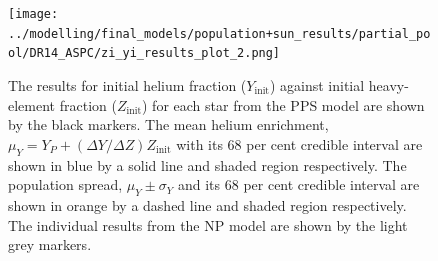 \documentclass[a4paper,fleqn,usenatbib]{mnras}
\begin{document}


\begin{figure}
    \centering
    \texttt{[image: ../modelling/final\_models/population+sun\_results/partial\_pool/DR14\_ASPC/zi\_yi\_results\_plot\_2.png]}
    \caption{The results for initial helium fraction ($Y_\mathrm{init}$) against initial heavy-element fraction ($Z_\mathrm{init}$) for each star from the PPS model are shown by the black markers. The mean helium enrichment, $\mu_Y = Y_P + (\Delta Y / \Delta Z) Z_\mathrm{init}$ with its 68 per cent credible interval are shown in blue by a solid line and shaded region respectively. The population spread, $\mu_Y \pm \sigma_Y$ and its 68 per cent credible interval are shown in orange by a dashed line and shaded region respectively. The individual results from the NP model are shown by the light grey markers.}
    \label{fig:helium}
\end{figure}
\end{document}
